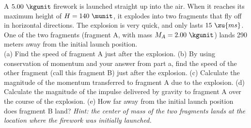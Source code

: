 A $5.00\ \kgunit$ firework is launched straight up into the air. When
it reaches its maximum height of $H = 140\ \munit$, it explodes into two
fragments that fly off in horizontal directions. The explosion is
very quick, and only lasts $15\ \zu{ms}$. One of the two fragments
(fragment A, with mass $M_A = 2.00\ \kgunit$) lands 290 meters away from
the initial launch position.\\
%
(a) Find the speed of fragment A just after the
explosion.\answercheck\hwendpart
%
(b) By using conservation of momentum and your answer from part a,
find the speed of the other fragment (call this fragment B) just
after the explosion.\answercheck\hwendpart
%
(c) Calculate the magnitude of the momentum transferred to fragment A
due to the explosion.\answercheck\hwendpart
%
(d) Calculate the magnitude of the impulse delivered by gravity to
fragment A over the course of the explosion.\answercheck\hwendpart
%
(e) How far away from the initial launch position does fragment B
land? \emph{Hint: the center of mass of the two fragments lands at
the location where the firework was initially launched.}\answercheck
